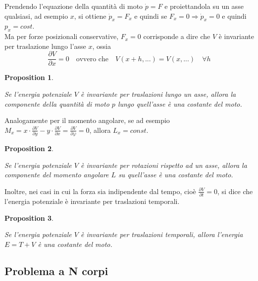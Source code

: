 \documentclass{article}
\newtheorem{proposition}{Proposition}[section]
\begin{document}
            Prendendo l'equazione della quantità di moto $\dot{p} = F$ e proiettandola su un asse qualsiasi, ad esempio $x$, si ottiene $\dot{p}_x = F_x$ e 
            quindi se $F_x = 0 \Longrightarrow \dot{p}_x = 0$ e quindi $p_x = cost$. \\
            Ma per forze posizionali conservative, $F_x = 0$ corrisponde a dire che $V$ è invariante per traslazione lungo l'asse $x$, ossia 
            \[ \frac{\partial V}{\partial x} = 0 \quad \textrm{ovvero che} \quad V(x + h, ...) = V(x, ...) \quad \forall h \]
            \begin{proposition}
                \label{prop:simmetrie e conservazioni}

                Se l'energia potenziale $V$ è invariante per traslazioni lungo un asse, allora la componente della quantità di moto $p$ lungo quell'asse è una costante del moto.

            \end{proposition}
            Analogamente per il momento angolare, se ad esempio $M_x = x \cdot \frac{\partial V}{\partial y} - y \cdot \frac{\partial V}{\partial x} = \frac{\partial V}{\partial \varphi} = 0 $, 
            allora $L_x = const$.
            \begin{proposition}
                \label{prop:simmetrie e conservazioni 2}
                
                Se l'energia potenziale $V$ è invariante per rotazioni rispetto ad un asse, allora la componente del momento angolare $L$ su quell'asse è una costante del moto.
            \end{proposition}
            Inoltre, nei casi in cui la forza sia indipendente dal tempo, cioè $\frac{\partial V}{\partial t} = 0$, si dice che l'energia potenziale è invariante per traslazioni temporali.
            \begin{proposition}
                \label{prop:simmetrie e conservazioni 3}
                
                Se l'energia potenziale $V$ è invariante per traslazioni temporali, allora l'energia $E = T + V$ è una costante del moto.
            \end{proposition} 


        \subsection{Problema a N corpi}
            
\end{document}
